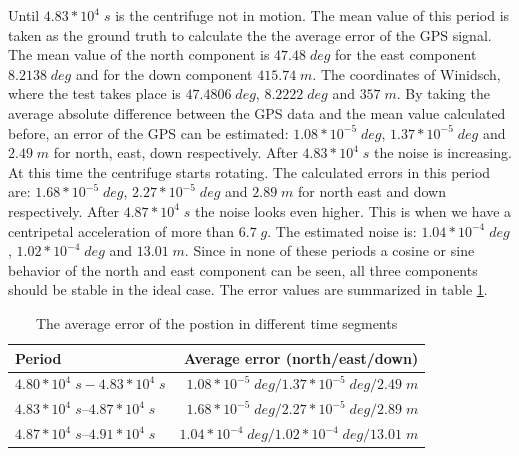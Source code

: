 Until $4.83*10^{4}\; s$ is the centrifuge not in motion. The mean value of this period is taken as the ground truth to calculate the the average error of the GPS signal. The mean value of the north component is $47.48\;deg$ for the east component $8.2138\;deg$ and for the down component $415.74\;m$. The coordinates of Winidsch, where the test takes place is $47.4806\;deg$, $8.2222\;deg$ and $357\;m$. By taking the average absolute difference between the GPS data and the mean value calculated before, an error of the GPS can be estimated: $1.08*10^{-5}\;deg$, $1.37*10^{-5}\;deg$ and $2.49\;m$ for north, east, down respectively. After $4.83*10^{4}\;s$ the noise is increasing. At this time the centrifuge starts rotating. The calculated  errors in this period are: $1.68*10^{-5}\;deg$, $2.27*10^{-5}\;deg$ and $2.89\;m$ for north east and down respectively. After $4.87*10^{4}\;s$ the noise looks even higher. This is when we have  a centripetal acceleration of more than  $6.7\;g$. The estimated noise is: $1.04*10^{-4}\;deg$, $1.02*10^{-4}\;deg$ and $13.01\;m$. Since in none of these periods a cosine or sine behavior of the north and east component can be seen, all three components should be stable in the ideal case. The error values are summarized in table \ref{ct_pos_error}.
\begin{table}[h]
\centering
\begin{tabular}{|l|r|}
\hline
Period & Average error (north/east/down) \\
\hline
$4.80*10^{4}\;s - 4.83*10^{4}\;s$&$1.08*10^{-5}\;deg / 1.37*10^{-5}\;deg / 2.49\;m$\\
\hline
$4.83*10^{4}\;s – 4.87*10^{4}\;s$&$1.68*10^{-5}\;deg / 2.27*10^{-5}\;deg / 2.89\;m$\\
\hline
$4.87*10^{4}\;s – 4.91*10^{4}\;s$&$1.04*10^{-4}\;deg/ 1.02*10^{-4}\;deg / 13.01\;m$\\
\hline
\end{tabular}
\caption{The average error of the postion in different time segments}
\label{ct_pos_error}
\end{table}

